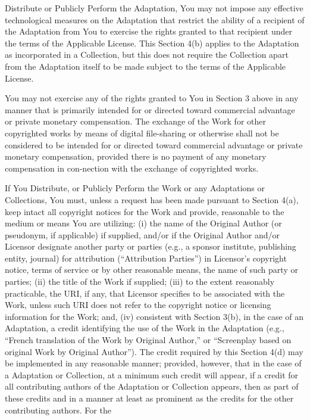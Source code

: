 \begin{doclicense@enumerate}
Distribute or Publicly Perform the Adaptation, You may
not impose any effective technological measures on the
Adaptation that restrict the ability of a recipient of
the Adaptation from You to exercise the rights granted to
that recipient under the terms of the Applicable License.
This Section 4(b) applies to the Adaptation as
incorporated in a Collection, but this does not require
the Collection apart from the Adaptation itself to be
made subject to the terms of the Applicable License.
\item You may not exercise any of the rights granted to You
in Section 3 above in any manner that is primarily
intended for or directed toward commercial advantage or
private monetary compensation. The exchange of the Work
for other copyrighted works by means of digital
file-sharing or otherwise shall not be considered to be
intended for or directed toward commercial advantage or
private monetary compensation, provided there is no
payment of any monetary compensation in con-nection with
the exchange of copyrighted works.
\item If You Distribute, or Publicly Perform the Work or
any Adaptations or Collections, You must, unless a
request has been made pursuant to Section 4(a), keep
intact all copyright notices for the Work and provide,
reasonable to the medium or means You are utilizing: (i)
the name of the Original Author (or pseudonym, if
applicable) if supplied, and/or if the Original Author
and/or Licensor designate another party or parties (e.g.,
a sponsor institute, publishing entity, journal) for
attribution (``Attribution Parties'') in Licensor's
copyright notice, terms of service or by other reasonable
means, the name of such party or parties; (ii) the title
of the Work if supplied; (iii) to the extent reasonably
practicable, the URI, if any, that Licensor specifies to
be associated with the Work, unless such URI does not
refer to the copyright notice or licensing information
for the Work; and, (iv) consistent with Section 3(b), in
the case of an Adaptation, a credit identifying the use
of the Work in the Adaptation (e.g., ``French translation
of the Work by Original Author,'' or ``Screenplay based on
original Work by Original Author''). The credit required
by this Section 4(d) may be implemented in any reasonable
manner; provided, however, that in the case of a
Adaptation or Collection, at a minimum such credit will
appear, if a credit for all contributing authors of the
Adaptation or Collection appears, then as part of these
credits and in a manner at least as prominent as the
credits for the other contributing authors. For the

\end{doclicense@enumerate}

